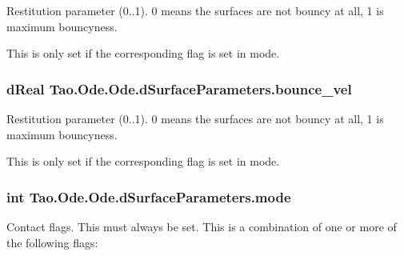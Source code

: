 Restitution parameter (0..1). 0 means the surfaces are not bouncy at all, 1 is maximum bouncyness. 

This is only set if the corresponding flag is set in mode. \hypertarget{struct_tao_1_1_ode_1_1_ode_1_1d_surface_parameters_af77b6d5d3b2ba9a132d65a9ed46e32d4}{
\subsubsection[{bounce\_\-vel}]{\setlength{\rightskip}{0pt plus 5cm}dReal {\bf Tao.Ode.Ode.dSurfaceParameters.bounce\_\-vel}}}
\label{struct_tao_1_1_ode_1_1_ode_1_1d_surface_parameters_af77b6d5d3b2ba9a132d65a9ed46e32d4}


Restitution parameter (0..1). 0 means the surfaces are not bouncy at all, 1 is maximum bouncyness. 

This is only set if the corresponding flag is set in mode. \hypertarget{struct_tao_1_1_ode_1_1_ode_1_1d_surface_parameters_aae7058942ccb4df5cf6fbe3176965fd6}{
\subsubsection[{mode}]{\setlength{\rightskip}{0pt plus 5cm}int {\bf Tao.Ode.Ode.dSurfaceParameters.mode}}}
\label{struct_tao_1_1_ode_1_1_ode_1_1d_surface_parameters_aae7058942ccb4df5cf6fbe3176965fd6}


Contact flags. This must always be set. This is a combination of one or more of the following flags: 

